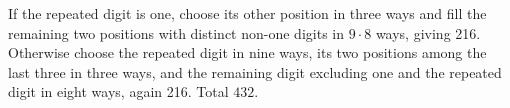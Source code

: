 If the repeated digit is one, choose its other position in three ways and fill the remaining two positions with distinct non-one digits in $9\cdot8$ ways, giving 216. Otherwise choose the repeated digit in nine ways, its two positions among the last three in three ways, and the remaining digit excluding one and the repeated digit in eight ways, again 216. Total $\boxed{432}$.
